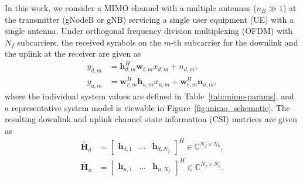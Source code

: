 In this work, we consider a MIMO channel with a multiple antennas ($n_B \gg 1$) at the transmitter (gNodeB or gNB) servicing a single user equipment (UE) with a single antenna. Under orthogonal frequency division multiplexing (OFDM) with $N_f$ subcarriers, the received symbols on the $m$-th subcarrier for the downlink and the uplink at the receiver are given as
\begin{align*}
	y_{d,m} &= \mathbf h_{d,m}^H\mathbf w_{t,m}x_{d,m} + n_{d,m}, \\
	y_{u,m} &= \mathbf w_{r,m}^H\mathbf h_{u,m}x_{u,m} + \mathbf w_{r,m}^H\mathbf n_{u,m},
\end{align*}
where the individual system values are defined in Table~\ref{tab:mimo-params}, and a representative system model is viewable in Figure~\ref{fig:mimo_schematic}. The resulting downlink and uplink channel state information (CSI) matrices are given as
\begin{align*} 
	\bar{\mathbf H}_d &= \begin{bmatrix} \mathbf h_{d,1} & \dots & \mathbf h_{d,N_f}\end{bmatrix}^H \in \mathbb C^{N_f \times N_b}, \\
	\bar{\mathbf H}_u &= \begin{bmatrix} \mathbf h_{u,1} & \dots & \mathbf h_{u,N_f}\end{bmatrix}^H \in \mathbb C^{N_f \times N_b}.
\end{align*}
